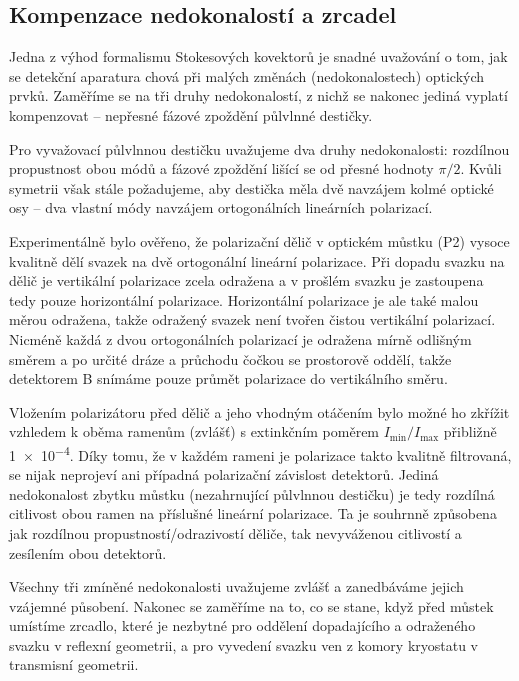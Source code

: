 \subsection{Kompenzace nedokonalostí a zrcadel}
\label{chap:kompenzace}

Jedna z výhod formalismu Stokesových kovektorů je snadné uvažování o tom, jak se detekční aparatura chová při malých změnách (nedokonalostech) optických prvků.
Zaměříme se na tři druhy nedokonalostí, z nichž se nakonec jediná vyplatí kompenzovat -- nepřesné fázové zpoždění půlvlnné destičky.

Pro vyvažovací půlvlnnou destičku uvažujeme dva druhy nedokonalosti: rozdílnou propustnost obou módů a fázové zpoždění lišící se od přesné hodnoty $\pi/2$.
Kvůli symetrii však stále požadujeme, aby destička měla dvě navzájem kolmé optické osy -- dva vlastní módy navzájem ortogonálních lineárních polarizací.

Experimentálně bylo ověřeno, že polarizační dělič v optickém můstku (P2) vysoce kvalitně dělí svazek na dvě ortogonální lineární polarizace.
Při dopadu svazku na dělič je vertikální polarizace zcela odražena a v prošlém svazku je zastoupena tedy pouze horizontální polarizace.
Horizontální polarizace je ale také malou měrou odražena, takže odražený svazek není tvořen čistou vertikální polarizací. 
Nicméně každá z dvou ortogonálních polarizací je odražena mírně odlišným směrem a po určité dráze a průchodu čočkou se prostorově oddělí, takže detektorem B snímáme pouze průmět polarizace do vertikálního směru.

Vložením polarizátoru před dělič a jeho vhodným otáčením bylo možné ho zkřížit vzhledem k oběma ramenům (zvlášť) s extinkčním poměrem $I_\textrm{min}/I_\textrm{max}$ přibližně \num{1e-4}.
Díky tomu, že v každém rameni je polarizace takto kvalitně filtrovaná, se nijak neprojeví ani případná polarizační závislost detektorů.
Jediná nedokonalost zbytku můstku (nezahrnující půlvlnnou destičku) je tedy rozdílná citlivost obou ramen na příslušné lineární polarizace.
Ta je souhrnně způsobena jak rozdílnou propustností/odrazivostí děliče, tak nevyváženou citlivostí a zesílením obou detektorů.

Všechny tři zmíněné nedokonalosti uvažujeme zvlášť a zanedbáváme jejich vzájemné působení.
Nakonec se zaměříme na to, co se stane, když před můstek umístíme zrcadlo, které je nezbytné pro oddělení dopadajícího a odraženého svazku v reflexní geometrii, a pro vyvedení svazku ven z komory kryostatu v transmisní geometrii.


